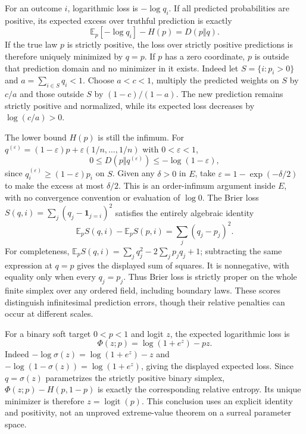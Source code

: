 \documentclass[11pt,a4paper]{article}
\numberwithin{equation}{section}
\theoremstyle{definition}
\theoremstyle{remark}
\newcommand{\E}{\mathbb E}
\newcommand{\logit}{\operatorname{logit}}
\newcommand{\ind}{\mathbf 1}
\newcommand{\eps}{\varepsilon}
\begin{document}
For an outcome $i$, logarithmic loss is $-\log q_i$. If all predicted
probabilities are positive, its expected excess over truthful prediction
is exactly
\begin{equation}
 \E_p[-\log q_i]-H(p)=D(p\Vert q).
\end{equation}
If the true law $p$ is strictly positive, the loss over strictly
positive predictions is therefore uniquely minimized by $q=p$.
If $p$ has a zero coordinate, $p$ is outside that prediction domain
and no minimizer in it exists. Indeed let $S=\{i:p_i>0\}$ and
$a=\sum_{i\in S}q_i<1$. Choose $a<c<1$, multiply the predicted weights
on $S$ by $c/a$ and those outside $S$ by $(1-c)/(1-a)$.
The new prediction remains strictly positive and normalized, while its
expected loss decreases by $\log(c/a)>0$.

The lower bound $H(p)$ is still the infimum. For
$q^{(\eps)}=(1-\eps)p+\eps(1/n,\ldots,1/n)$ with $0<\eps<1$,
\[
 0\le D(p\Vert q^{(\eps)})\le-\log(1-\eps),
\]
since $q_i^{(\eps)}\ge(1-\eps)p_i$ on $S$. Given any $\delta>0$ in
$E$, take $\eps=1-\exp(-\delta/2)$ to make the excess at most
$\delta/2$. This is an order-infimum argument inside $E$, with no
convergence convention or evaluation of $\log0$.
The Brier loss
$S(q,i)=\sum_j(q_j-\ind_{j=i})^2$ satisfies the entirely algebraic identity
\begin{equation}
 \E_p S(q,i)-\E_p S(p,i)=\sum_j(q_j-p_j)^2.
\end{equation}
For completeness,
$\E_pS(q,i)=\sum_jq_j^2-2\sum_jp_jq_j+1$;
subtracting the same expression at $q=p$ gives the displayed sum of
squares. It is nonnegative, with equality only when every $q_j=p_j$.
Thus Brier loss is strictly proper on the whole finite simplex over any
ordered field, including boundary laws.
These scores distinguish infinitesimal prediction errors, though their
relative penalties can occur at different scales.

For a binary soft target $0<p<1$ and logit $z$, the expected logarithmic
loss is
\begin{equation}\label{fsp:eq:logisticloss}
 \Phi(z;p)=\log(1+e^z)-pz.
\end{equation}
Indeed $-\log\sigma(z)=\log(1+e^z)-z$ and
$-\log(1-\sigma(z))=\log(1+e^z)$, giving the displayed expected loss.
Since $q=\sigma(z)$ parametrizes the strictly positive binary simplex,
$\Phi(z;p)-H(p,1-p)$ is exactly the corresponding relative entropy.
Its unique minimizer is therefore $z=\logit(p)$. This conclusion uses an explicit
identity and positivity, not an unproved extreme-value theorem on a
surreal parameter space.
\end{document}
